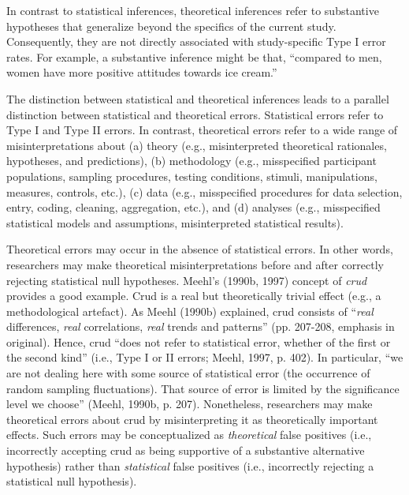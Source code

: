 \documentclass[authordate, empirical]{jote-new-article}
\begin{document}
	In contrast to statistical inferences, theoretical inferences refer to substantive hypotheses that generalize beyond the specifics of the current study. Consequently, they are not directly associated with study-specific Type I error rates. For example, a substantive inference might be that, “compared to men, women have more positive attitudes towards ice cream.”



	The distinction between statistical and theoretical inferences leads to a parallel distinction between statistical and theoretical errors. Statistical errors refer to Type I and Type II errors. In contrast, theoretical errors refer to a wide range of misinterpretations about (a) theory (e.g., misinterpreted theoretical rationales, hypotheses, and predictions), (b) methodology (e.g., misspecified participant populations, sampling procedures, testing conditions, stimuli, manipulations, measures, controls, etc.), (c) data (e.g., misspecified procedures for data selection, entry, coding, cleaning, aggregation, etc.), and (d) analyses (e.g., misspecified statistical models and assumptions, misinterpreted statistical results).



	Theoretical errors may occur in the absence of statistical errors. In other words, researchers may make theoretical misinterpretations before and after correctly rejecting statistical null hypotheses. Meehl's (1990b, 1997) concept of \emph{crud }provides a good example. Crud is a real but theoretically trivial effect (e.g., a methodological artefact). As Meehl (1990b) explained, crud consists of “\emph{real} differences, \emph{real} correlations, \emph{real} trends and patterns” (pp. 207-208, emphasis in original). Hence, crud “does not refer to statistical error, whether of the first or the second kind” (i.e., Type I or II errors; Meehl, 1997, p. 402). In particular, “we are not dealing here with some source of statistical error (the occurrence of random sampling fluctuations). That source of error is limited by the significance level we choose” (Meehl, 1990b, p. 207). Nonetheless, researchers may make theoretical errors about crud by misinterpreting it as theoretically important effects. Such errors may be conceptualized as \emph{theoretical} false positives (i.e., incorrectly accepting crud as being supportive of a substantive alternative hypothesis) rather than \emph{statistical} false positives (i.e., incorrectly rejecting a statistical null hypothesis).
\end{document}
